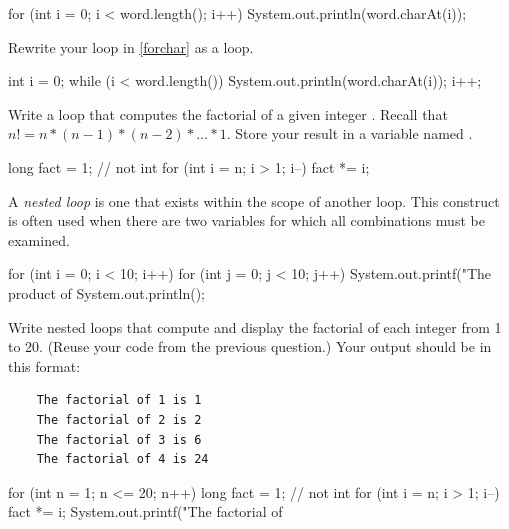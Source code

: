 \begin{answer}
\vspace{-1ex}
\begin{javaans}
    for (int i = 0; i < word.length(); i++) {
        System.out.println(word.charAt(i));
    }
\end{javaans}
\end{answer}


\Q Rewrite your  loop in \ref{forchar} as a  loop.

\begin{answer}[6em]
\vspace{-1ex}
\begin{javaans}
    int i = 0;
    while (i < word.length()) {
        System.out.println(word.charAt(i));
        i++;
    }
\end{javaans}
\end{answer}


\Q Write a loop that computes the factorial of a given integer .
Recall that $n! = n * (n-1) * (n-2) * \ldots * 1$.
Store your result in a variable named .

\begin{answer}[6em]
\vspace{-1ex}
\begin{javaans}
    long fact = 1;  // not int
    for (int i = n; i > 1; i--) {
        fact *= i;
    }
\end{javaans}
\end{answer}


\Q \label{nested}
A \emph{nested loop} is one that exists within the scope of another loop.
This construct is often used when there are two variables for which all combinations must be examined.

\begin{javalst}
    for (int i = 0; i < 10; i++) {
        for (int j = 0; j < 10; j++) {
            System.out.printf("The product of %
        }
        System.out.println();
    }
\end{javalst}

Write nested loops that compute and display the factorial of each integer from 1 to 20.
(Reuse your code from the previous question.)
Your output should be in this format:

\vspace{-1ex}
\begin{verbatim}
    The factorial of 1 is 1
    The factorial of 2 is 2
    The factorial of 3 is 6
    The factorial of 4 is 24
\end{verbatim}
\vspace{-3ex}

\begin{answer}[10em]
\begin{javaans}
    for (int n = 1; n <= 20; n++) {
        long fact = 1;  // not int
        for (int i = n; i > 1; i--) {
            fact *= i;
        }
        System.out.printf("The factorial of %
    }
\end{javaans}
\end{answer}
